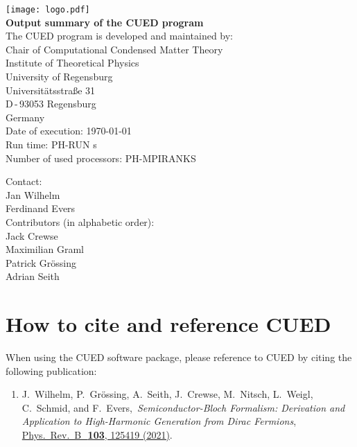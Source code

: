 \documentclass[11pt, a4paper]{scrartcl}
\newcommand{\paper}[4]{\item #1, \,\textit{#2}, \,\href{#3}{#4}.\\[-1.4em]}
\begin{document}

\begin{titlepage}
  \sffamily
  \begin{center}
{
\texttt{[image: logo.pdf]}
\\[5em]
\Huge \bfseries Output summary of the CUED program}
\\[3em]\large
The CUED program is developed and maintained by:
\\[3em]
Chair of Computational Condensed Matter Theory
  \\[0.5em]
Institute of Theoretical Physics
  \\[0.5em]
University of Regensburg
  \\[0.5em]
Universitätsstraße 31
  \\[0.5em]
D\,-\,93053 Regensburg
  \\[0.5em]
Germany
\\[3em]
Date of execution: \today
  \\[0.5em]
Run time: PH-RUN s
  \\[0.5em]
Number of used processors: PH-MPIRANKS
\\[3em]
  \end{center}{\large
  Contact:
  \\[1em]
    Jan Wilhelm
      \\[0.5em]
    Ferdinand Evers
  \\[3em]
  Contributors (in alphabetic order): 
  \\[1em]
  Jack Crewse
  \\[0.5em]
    Maximilian Graml
  \\[0.5em]
  Patrick Grössing
  \\[0.5em]
  Adrian Seith
  }
\end{titlepage}







\pagestyle{plain}




\tableofcontents


\pagestyle{fancy}
\section{How to cite and reference CUED}
When using the CUED software package, please reference to CUED by citing the following publication:
\begin{enumerate}[leftmargin=*]

\paper{J.~Wilhelm, P.~Grössing, A.~Seith, J.~Crewse, M.~Nitsch, L.~Weigl, C.~Schmid, and F.~Evers}{Semi\-con\-duc\-tor-Bloch Formalism: Derivation and Application to High-Harmonic Generation from Dirac Fermions}{https://doi.org/10.1103/PhysRevB.103.125419}{ 
Phys.~Rev.~B~\,\textbf{103}, 125419 (2021)}
\label{Wilhelm2021}

\end{enumerate}
\end{document}
